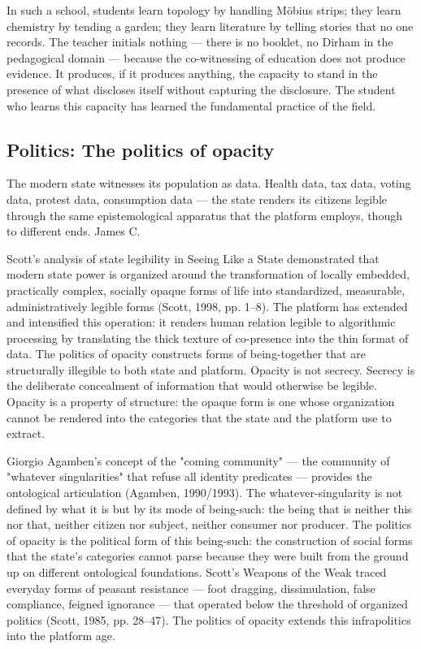 In such a school, students learn topology by handling Möbius strips; they learn chemistry by tending a garden; they learn literature by telling stories that no one records. The teacher initials nothing — there is no booklet, no Dirham in the pedagogical domain — because the co-witnessing of education does not produce evidence. It produces, if it produces anything, the capacity to stand in the presence of what discloses itself without capturing the disclosure. The student who learns this capacity has learned the fundamental practice of the field.

\subsection{Politics: The politics of opacity}

The modern state witnesses its population as data. Health data, tax data, voting data, protest data, consumption data — the state renders its citizens legible through the same epistemological apparatus that the platform employs, though to different ends. James C.

Scott's analysis of state legibility in Seeing Like a State demonstrated that modern state power is organized around the transformation of locally embedded, practically complex, socially opaque forms of life into standardized, measurable, administratively legible forms (Scott, 1998, pp. 1–8). The platform has extended and intensified this operation: it renders human relation legible to algorithmic processing by translating the thick texture of co-presence into the thin format of data. The politics of opacity constructs forms of being-together that are structurally illegible to both state and platform. Opacity is not secrecy. Secrecy is the deliberate concealment of information that would otherwise be legible. Opacity is a property of structure: the opaque form is one whose organization cannot be rendered into the categories that the state and the platform use to extract.

Giorgio Agamben's concept of the "coming community" — the community of "whatever singularities" that refuse all identity predicates — provides the ontological articulation (Agamben, 1990/1993). The whatever-singularity is not defined by what it is but by its mode of being-such: the being that is neither this nor that, neither citizen nor subject, neither consumer nor producer. The politics of opacity is the political form of this being-such: the construction of social forms that the state's categories cannot parse because they were built from the ground up on different ontological foundations. Scott's Weapons of the Weak traced everyday forms of peasant resistance — foot dragging, dissimulation, false compliance, feigned ignorance — that operated below the threshold of organized politics (Scott, 1985, pp. 28–47). The politics of opacity extends this infrapolitics into the platform age.

